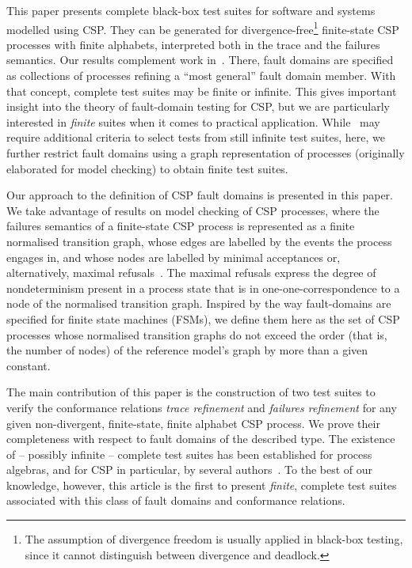 This paper presents complete black-box test suites for software and systems
modelled using CSP. They can be generated for divergence-free\footnote{The
assumption of divergence freedom is usually applied in black-box testing,
since it cannot distinguish between divergence and deadlock.} finite-state
CSP processes with finite alphabets, interpreted both in the trace and the
failures semantics. Our results complement work
in~\cite{DBLP:conf/pts/CavalcantiS17}. There, fault domains are specified as
collections of processes refining a ``most general'' fault domain member.
With that concept, complete test suites may be finite or infinite. This gives
important insight into the theory of fault-domain testing for CSP, but we are
particularly interested in {\it finite} suites when it comes to practical
application. While~\cite{DBLP:conf/pts/CavalcantiS17} may require additional
criteria to select tests from still infinite test suites, here, we further
restrict fault domains using a graph representation of processes (originally
elaborated for model checking) to obtain finite test suites. 

Our approach to the definition of CSP fault domains is presented in this
paper. We take advantage of results on model checking of CSP
processes, where the failures semantics of a finite-state CSP process is
represented as a finite normalised transition graph, whose edges are labelled
by the events the process engages in, and whose nodes are labelled by minimal
acceptances or, alternatively, maximal
refusals~\cite{Roscoe:1994:CME:197600}. The maximal refusals express the
degree of nondeterminism present in a process state that is in
one-one-correspondence to a node of the normalised transition graph. Inspired
by the way fault-domains are specified for finite state machines (FSMs),
we define them here as the set of CSP processes whose normalised transition
graphs do not exceed the order (that is, the number of nodes) of the
reference model's graph by more than a given constant.

The main contribution of this paper is the construction of two test suites to
verify the conformance relations \emph{trace refinement} and \emph{failures
refinement} for any given non-divergent, finite-state, finite alphabet CSP
process. We prove their completeness with respect to fault domains
of the described type.  The existence of -- possibly infinite -- complete
test suites has been established for process algebras, and for CSP in
particular, by several
authors~\cite{Hennessy:1988:ATP:50497,Schneider:1995:OST:203471.203475,DBLP:conf/fm/PeleskaS96,peleska1997a,DBLP:conf/icfem/CavalcantiG07,DBLP:conf/pts/CavalcantiS17}.
To the best of our knowledge, however, this article is the first to present
{\it finite}, complete test suites associated with this class of fault
domains and conformance relations.

